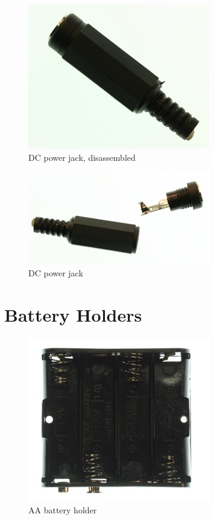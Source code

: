 \begin{figure}[!htb]
     \centering
     \includegraphics[scale=0.5]{img/components/power_jack.jpg}
     \caption{DC power jack, disassembled}
     \label{DC power jack, disassembled}
\end{figure}

\begin{figure}[!htb]
     \centering
     \includegraphics[scale=0.3]{img/components/power_jack_2.jpg}
     \caption{DC power jack}
     \label{DC power jack}
\end{figure}

\section{Battery Holders}

\begin{figure}[!htb]
     \centering
     \includegraphics[scale=0.5]{img/components/battery_holder.jpg}
     \caption{AA battery holder}
     \label{AA battery holder}
\end{figure}


